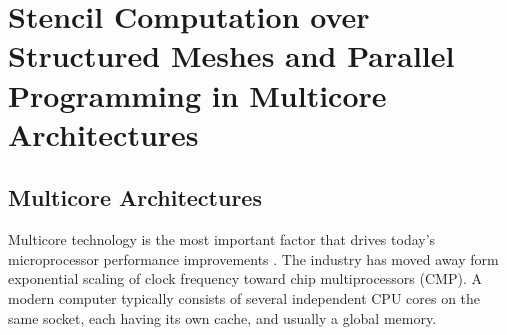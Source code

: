 \chapter{Stencil Computation over Structured Meshes and Parallel Programming in Multicore Architectures}




\section{Multicore Architectures}
\label{sec:multicore_architectures}
Multicore technology is the most important factor that drives today’s microprocessor performance improvements \cite{article6}. The industry has moved away form exponential scaling of clock frequency toward chip multiprocessors (CMP). A modern computer typically consists of several independent CPU cores on the same socket, each having its own cache, and usually a global memory.  

